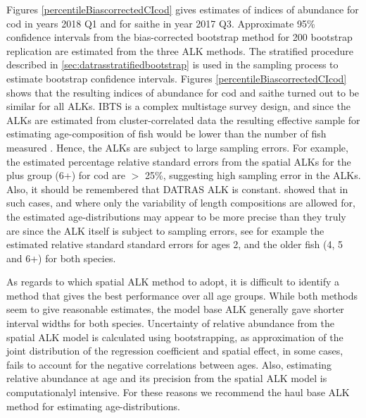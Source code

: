 \documentclass[a4paper 12pt]{article}
\numberwithin{equation}{section}
\begin{document}
\clearpage
Figures \ref{percentileBiascorrectedCIcod} gives estimates of indices of abundance for cod in years 2018 Q1 and for saithe in year 2017 Q3. Approximate 95\% confidence intervals from the bias-corrected bootstrap method for 200 bootstrap replication are estimated from the three ALK methods. The stratified procedure described in \ref{sec:datrasstratifiedbootstrap} is used in the sampling process to estimate bootstrap confidence intervals.   Figures \ref{percentileBiascorrectedCIcod}  shows that the resulting indices of abundance for cod and saithe turned out to be similar for all ALKs. IBTS is a complex multistage survey design, and since the ALKs are estimated from cluster-correlated data the resulting effective sample for estimating age-composition of fish would be lower than the number of fish measured \citep{ICES2013PICS3}. Hence, the ALKs are subject to large sampling errors. For example, the estimated percentage relative standard errors from the spatial ALKs for the plus group (6+) for cod are $>$ 25\%, suggesting high sampling error in the ALKs. Also, it should be remembered that DATRAS ALK is constant.   \citet{aanes2015efficient} showed that in such cases, and where only the variability of  length compositions are allowed for, the estimated age-distributions may appear to be more precise than they truly are since the ALK itself is subject to sampling errors, see for example the estimated relative standard standard errors for ages 2, and the older fish (4, 5 and 6+) for both species. 

As regards to which spatial ALK method to adopt, it is difficult to identify a method that gives the best performance over all age groups. While both methods seem to give reasonable estimates, the model base ALK generally gave shorter interval widths for both species. Uncertainty of relative abundance from the spatial ALK model is calculated using bootstrapping, as approximation of the joint distribution of the regression coefficient and spatial effect, in some cases, fails to account for the  negative correlations between ages. Also, estimating relative abundance at age and its precision from the spatial ALK model is computationalyl intensive. For these reasons we recommend the haul base ALK method for estimating age-distributions.

\end{document}
